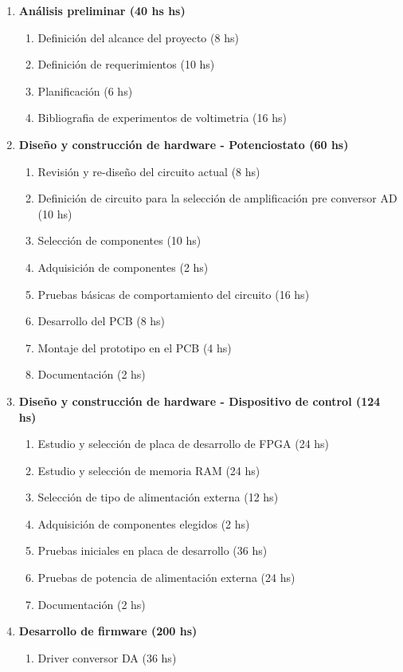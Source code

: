 \documentclass[11pt]{charter}
\begin{document}
\begin{enumerate}
\item \textbf{Análisis preliminar (40 hs hs)} 
	\begin{enumerate}
		\item Definición del alcance del proyecto (8 hs)
		\item Definición de requerimientos (10 hs)
		\item Planificación (6 hs)
		\item Bibliografia de experimentos de voltimetria (16 hs)
	\end{enumerate}
\item \textbf{Diseño y construcción de hardware - Potenciostato (60 hs)}
	\begin{enumerate}
		\item Revisión y re-diseño del circuito actual (8 hs)
		\item Definición de circuito para la selección de amplificación pre conversor AD (10 hs)
		\item Selección de componentes (10 hs)
		\item Adquisición de componentes (2 hs)
		\item Pruebas básicas de comportamiento del circuito (16 hs)
		\item Desarrollo del PCB (8 hs)
		\item Montaje del prototipo en el PCB (4 hs)
		\item Documentación (2 hs)
	\end{enumerate}
\item \textbf{Diseño y construcción de hardware - Dispositivo de control (124 hs)}
	\begin{enumerate}
		\item Estudio y selección de placa de desarrollo de FPGA (24 hs)
		\item Estudio y selección de memoria RAM (24 hs)
		\item Selección de tipo de alimentación externa (12 hs)
		\item Adquisición de componentes elegidos (2 hs)
		\item Pruebas iniciales en placa de desarrollo (36 hs)
		\item Pruebas de potencia de alimentación externa (24 hs)
		\item Documentación (2 hs)
	\end{enumerate}
\item \textbf{Desarrollo de firmware (200 hs)}
	\begin{enumerate}
		\item Driver conversor DA (36 hs)

\end{enumerate}
\end{enumerate}
\end{document}
